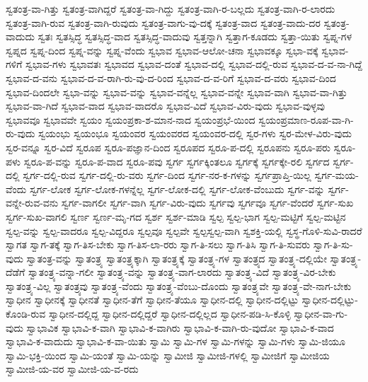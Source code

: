 {ಸ್ವತಂತ್ರ-ವಾ-ಗಿತ್ತು
ಸ್ವತಂತ್ರ-ವಾಗಿದ್ದರೆ
ಸ್ವತಂತ್ರ-ವಾ-ಗಿದ್ದು
ಸ್ವತಂತ್ರ-ವಾಗಿ-ರ-ಬಲ್ಲದು
ಸ್ವತಂತ್ರ-ವಾಗಿ-ರ-ಲಾರದು
ಸ್ವತಂತ್ರ-ವಾಗಿ-ರುವ
ಸ್ವತಂತ್ರ-ವಾಗಿ-ರುವುದು
ಸ್ವತಂತ್ರ-ವಾಗು-ವು-ದಕ್ಕೆ
ಸ್ವತಂತ್ರ-ವಾದ
ಸ್ವತಂತ್ರ-ವಾದು-ದರ
ಸ್ವತಂತ್ರ-ವಾದುದು
ಸ್ವತಃ
ಸ್ವತಸ್ಸಿದ್ಧ
ಸ್ವತಸ್ಸಿದ್ಧ-ವಾದ
ಸ್ವತಸ್ಸಿದ್ಧ-ವಾದುವು
ಸ್ವತ್ತನ್ನಾಗಿ
ಸ್ವತ್ತಾಗ-ಕೂಡದು
ಸ್ವತ್ತಾ-ಯಿತು
ಸ್ವಪ್ನ-ಗಳ
ಸ್ವಪ್ನದ
ಸ್ವಪ್ನ-ದಿಂದ
ಸ್ವಪ್ನ-ವನ್ನು
ಸ್ವಪ್ನ-ವೆಂದು
ಸ್ವಭಾವ
ಸ್ವಭಾವ-ಆಲೋ-ಚನಾ
ಸ್ವಭಾವಕ್ಕೂ
ಸ್ವಭಾ-ವಕ್ಕೆ
ಸ್ವಭಾವ-ಗಳಿಗೆ
ಸ್ವಭಾವ-ಗಳು
ಸ್ವಭಾವತಃ
ಸ್ವಭಾವದ
ಸ್ವಭಾವ-ದಂತೆ
ಸ್ವಭಾವ-ದಲ್ಲಿ
ಸ್ವಭಾವ-ದಲ್ಲಿ-ರುವ
ಸ್ವಭಾವ-ದ-ವ-ನಾ-ಗಿದ್ದೆ
ಸ್ವಭಾವ-ದ-ವನು
ಸ್ವಭಾವ-ದ-ವ-ರಾಗಿ-ರು-ವು-ದ-ರಿಂದ
ಸ್ವಭಾವ-ದ-ವ-ರಿಗೆ
ಸ್ವಭಾವ-ದ-ವರು
ಸ್ವಭಾವ-ದಿಂದ
ಸ್ವಭಾವ-ದಿಂದಲೇ
ಸ್ವಭಾ-ವನ್ನು
ಸ್ವಭಾವ-ವನ್ನು
ಸ್ವಭಾವ-ವನ್ನೆಲ್ಲ
ಸ್ವಭಾವ-ವನ್ನೇ
ಸ್ವಭಾವ-ವಾಗಿ
ಸ್ವಭಾವ-ವಾ-ಗಿತ್ತು
ಸ್ವಭಾವ-ವಾ-ಗಿದೆ
ಸ್ವಭಾವ-ವಾದ
ಸ್ವಭಾವ-ವಾದರೊ
ಸ್ವಭಾವ-ವಿದೆ
ಸ್ವಭಾವ-ವಿರು-ವುದು
ಸ್ವಭಾವ-ವುಳ್ಳವು
ಸ್ವಭಾವವೂ
ಸ್ವಭಾವವೇ
ಸ್ವಯಂ
ಸ್ವಯಂಪ್ರಕಾ-ಶ-ಮಾನ-ನಾದ
ಸ್ವಯಂಪ್ರಭೆ-ಯಿಂದ
ಸ್ವಯಂಪ್ರಮಾಣ-ರೂಪ-ವಾ-ಗಿ-ರು-ವುದು
ಸ್ವಯಂಭು
ಸ್ವಯಂಭೂ
ಸ್ವಯಂವರ
ಸ್ವಯಂವರದ
ಸ್ವಯಂವರ-ದಲ್ಲಿ
ಸ್ವರ-ಗಳು
ಸ್ವರ-ಮೇಳ-ವಿರು-ವುದು
ಸ್ವರ-ವನ್ನೂ
ಸ್ವರ-ವಿದೆ
ಸ್ವರೂಪ
ಸ್ವರೂ-ಪಜ್ಞಾನ-ದಿಂದ
ಸ್ವರೂಪದ
ಸ್ವರೂ-ಪ-ದಲ್ಲಿ
ಸ್ವರೂಪನು
ಸ್ವರೂ-ಪರು
ಸ್ವರೂ-ಪಳು
ಸ್ವರೂ-ಪ-ವನ್ನು
ಸ್ವರೂ-ಪ-ವಾದ
ಸ್ವರೂ-ಪವು
ಸ್ವರ್ಗ
ಸ್ವರ್ಗಕ್ಕಿಂತಲೂ
ಸ್ವರ್ಗಕ್ಕೆ
ಸ್ವರ್ಗಕ್ಕೇ-ರಲಿ
ಸ್ವರ್ಗದ
ಸ್ವರ್ಗ-ದಲ್ಲಿ
ಸ್ವರ್ಗ-ದಲ್ಲಿ-ರುವ
ಸ್ವರ್ಗ-ದಲ್ಲಿ-ರು-ವರು
ಸ್ವರ್ಗ-ದಿಂದ
ಸ್ವರ್ಗ-ನರ-ಕ-ಗಳನ್ನು
ಸ್ವರ್ಗಪ್ರಾಪ್ತಿ-ಯಿಲ್ಲ
ಸ್ವರ್ಗ-ಮಯ-ವೆಂದು
ಸ್ವರ್ಗ-ಲೋಕ
ಸ್ವರ್ಗ-ಲೋಕ-ಗಳನ್ನೆಲ್ಲ
ಸ್ವರ್ಗ-ಲೋಕ-ದಲ್ಲಿ
ಸ್ವರ್ಗ-ಲೋಕ-ವೆಂಬುದು
ಸ್ವರ್ಗ-ವನ್ನು
ಸ್ವರ್ಗ-ವನ್ನೇ-ರುವ-ವನು
ಸ್ವರ್ಗ-ವಾಗಲೀ
ಸ್ವರ್ಗ-ವಾಗಿ
ಸ್ವರ್ಗ-ವಿರು-ವುದು
ಸ್ವರ್ಗವು
ಸ್ವರ್ಗವೂ
ಸ್ವರ್ಗ-ವೆಂದರೆ
ಸ್ವರ್ಗ-ಸುಖ
ಸ್ವರ್ಗ-ಸುಖ-ವಾಗಲಿ
ಸ್ವರ್ಣ
ಸ್ವರ್ಣ-ಮೃ-ಗದ
ಸ್ವರ್ಶ
ಸ್ವರ್ಶ-ಮಾಡಿ
ಸ್ವಲ್ಪ
ಸ್ವಲ್ಪ-ಭಾಗ
ಸ್ವಲ್ಪ-ಮಟ್ಟಿಗೆ
ಸ್ವಲ್ಪ-ಮಟ್ಟಿನ
ಸ್ವಲ್ಪ-ವನ್ನು
ಸ್ವಲ್ಪ-ವಾದರೂ
ಸ್ವಲ್ಪ-ವಿದ್ದರೂ
ಸ್ವಲ್ಪವೂ
ಸ್ವಲ್ಪವೇ
ಸ್ವಲ್ಪಸ್ವಲ್ಪ-ವಾಗಿ
ಸ್ವಶಕ್ತಿ-ಯಲ್ಲಿ
ಸ್ವಸ್ಥ-ಗೊಳಿ-ಸುವಿ-ರಾದರೆ
ಸ್ವಾಗತ
ಸ್ವಾಗ-ತಕ್ಕೆ
ಸ್ವಾಗ-ತಿಸ-ಬೇಕು
ಸ್ವಾಗ-ತಿಸ-ಲಾ-ರರು
ಸ್ವಾಗ-ತಿ-ಸಲು
ಸ್ವಾಗ-ತಿಸಿ
ಸ್ವಾಗ-ತಿ-ಸುವರು
ಸ್ವಾಗ-ತಿ-ಸು-ವುದು
ಸ್ವಾತಂತ್ರ-ವನ್ನು
ಸ್ವಾತಂತ್ರ್ಯ
ಸ್ವಾತಂತ್ರ್ಯಕ್ಕಾಗಿ
ಸ್ವಾತಂತ್ರ್ಯಕ್ಕೆ
ಸ್ವಾತಂತ್ರ್ಯ-ಗಳ
ಸ್ವಾತಂತ್ರ್ಯದ
ಸ್ವಾತಂತ್ರ್ಯ-ದಲ್ಲಿಯೇ
ಸ್ವಾತಂತ್ರ್ಯ-ದೆಡೆಗೆ
ಸ್ವಾತಂತ್ರ್ಯ-ವನ್ನಾ-ಗಲೀ
ಸ್ವಾತಂತ್ರ್ಯ-ವನ್ನು
ಸ್ವಾತಂತ್ರ್ಯ-ವಾಗ-ಲಾರದು
ಸ್ವಾತಂತ್ರ್ಯ-ವಿದೆ
ಸ್ವಾತಂತ್ರ್ಯ-ವಿರ-ಬೇಕು
ಸ್ವಾತಂತ್ರ್ಯ-ವಿಲ್ಲ
ಸ್ವಾತಂತ್ರ್ಯವು
ಸ್ವಾತಂತ್ರ್ಯ-ವೆಂದು
ಸ್ವಾತಂತ್ರ್ಯ-ವೆಂಬು-ದೊಂದು
ಸ್ವಾತಂತ್ರ್ಯವೇ
ಸ್ವಾತಂತ್ರ್ಯ-ವೇ-ನಾಗ-ಬೇಕು
ಸ್ವಾಧೀನ
ಸ್ವಾಧೀನಕ್ಕೆ
ಸ್ವಾಧೀನತೆ
ಸ್ವಾಧೀನ-ತೆಗೆ
ಸ್ವಾಧೀನ-ತೆಯೂ
ಸ್ವಾಧೀನ-ದಲ್ಲಿ
ಸ್ವಾಧೀನ-ದಲ್ಲಿಟ್ಟು
ಸ್ವಾಧೀನ-ದಲ್ಲಿಟ್ಟು-ಕೊಂಡಿ-ರುವ
ಸ್ವಾಧೀನ-ದಲ್ಲಿದ್ದ
ಸ್ವಾಧೀನ-ದಲ್ಲಿದ್ದರೆ
ಸ್ವಾಧೀನ-ದಲ್ಲಿಲ್ಲದ
ಸ್ವಾಧೀನ-ಪಡಿ-ಸಿ-ಕೊಳ್ಳಿ
ಸ್ವಾಧೀನ-ವಾ-ಗು-ವುದು
ಸ್ವಾಭಾವಿಕ
ಸ್ವಾಭಾವಿ-ಕ-ವಾಗಿ
ಸ್ವಾಭಾವಿ-ಕ-ವಾಗಿರು
ಸ್ವಾಭಾವಿ-ಕ-ವಾಗಿ-ರು-ವುದೋ
ಸ್ವಾಭಾವಿ-ಕ-ವಾದ
ಸ್ವಾಭಾವಿ-ಕ-ವಾದುದು
ಸ್ವಾಭಾವಿ-ಕ-ವಾ-ಯಿತು
ಸ್ವಾಮಿ
ಸ್ವಾಮಿ-ಗಳ
ಸ್ವಾಮಿ-ಗಳನ್ನು
ಸ್ವಾಮಿ-ಗಳು
ಸ್ವಾಮಿ-ಜಿಯೂ
ಸ್ವಾಮಿ-ಭಕ್ತಿ-ಯಿಂದ
ಸ್ವಾಮಿ-ಯಂತೆ
ಸ್ವಾಮಿ-ಯನ್ನು
ಸ್ವಾಮೀಜಿ
ಸ್ವಾಮೀಜಿ-ಗಳಲ್ಲಿ
ಸ್ವಾಮೀಜಿಗೆ
ಸ್ವಾಮೀಜಿಯ
ಸ್ವಾಮೀಜಿ-ಯ-ವರ
ಸ್ವಾಮೀಜಿ-ಯ-ವ-ರದು
}
